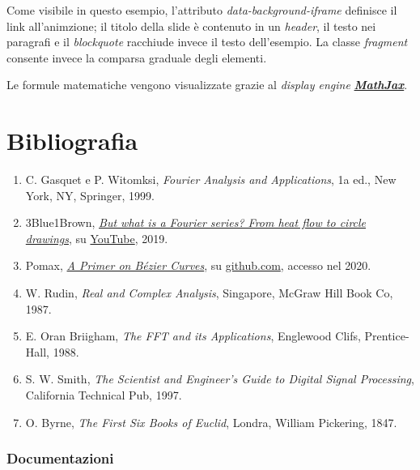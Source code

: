 \documentclass[
]{book}
\providecommand{\tightlist}{%
  \setlength{\itemsep}{0pt}\setlength{\parskip}{0pt}}
\begin{document}
Come visibile in questo esempio, l'attributo \emph{data-background-iframe} definisce il link all'animzione; il titolo della slide è contenuto in un \emph{header}, il testo nei paragrafi e il \emph{blockquote} racchiude invece il testo dell'esempio. La classe \emph{fragment} consente invece la comparsa graduale degli elementi.

Le formule matematiche vengono visualizzate grazie al \emph{display engine} \href{https://www.mathjax.org/}{\emph{\textbf{MathJax}}}.

\hypertarget{bibliografia}{%
\chapter*{Bibliografia}\label{bibliografia}}

\begin{enumerate}
\def\labelenumi{\arabic{enumi}.}
\tightlist
\item
  C. Gasquet e P. Witomksi, \emph{Fourier Analysis and Applications}, 1a ed., New York, NY, Springer, 1999.
\item
  3Blue1Brown, \href{www.youtube.com/watch?v=r6sGWTCMz2k}{\emph{But what is a Fourier series? From heat flow to circle drawings}}, su \href{https://www.youtube.com}{YouTube}, 2019.
\item
  Pomax, \href{https://pomax.github.io/bezierinfo/\#polybezier}{\emph{A Primer on Bézier Curves}}, su \href{https://github.com/}{github.com}, accesso nel 2020.
\item
  W. Rudin, \emph{Real and Complex Analysis}, Singapore, McGraw Hill Book Co, 1987.
\item
  E. Oran Briigham, \emph{The FFT and its Applications}, Englewood Clifs, Prentice-Hall, 1988.
\item
  S. W. Smith, \emph{The Scientist and Engineer's Guide to Digital Signal Processing}, California Technical Pub, 1997.
\item
  O. Byrne, \emph{The First Six Books of Euclid}, Londra, William Pickering, 1847.
\end{enumerate}

\hypertarget{documentazione}{%
\subsection*{Documentazioni}\label{documentazione}}
\end{document}
